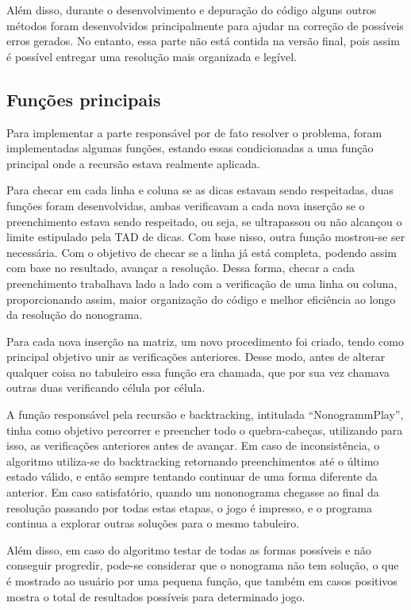 \documentclass{article}
\begin{document}
Além disso, durante o desenvolvimento e depuração do código alguns outros métodos foram desenvolvidos principalmente para ajudar na correção de possíveis erros gerados. No entanto, essa parte não está contida na versão final, pois assim é possível entregar uma resolução mais organizada e legível.

\subsection{Funções principais}

Para implementar a parte responsável por de fato resolver o problema, foram implementadas algumas funções, estando essas condicionadas a uma função principal onde a recursão estava realmente aplicada.

Para checar em cada linha e coluna se as dicas estavam sendo respeitadas, duas funções foram desenvolvidas, ambas verificavam a cada nova inserção se o preenchimento estava sendo respeitado, ou seja, se ultrapassou ou não alcançou o limite estipulado pela TAD de dicas. Com base nisso, outra função mostrou-se ser necessária. Com o objetivo de checar se a linha já está completa, podendo assim com base no resultado, avançar a resolução. Dessa forma, checar a cada preenchimento trabalhava lado a lado com a verificação de uma linha ou coluna, proporcionando assim, maior organização do código e melhor eficiência ao longo da resolução do nonograma.

Para cada nova inserção na matriz, um novo procedimento foi criado, tendo como principal objetivo unir as verificações anteriores. Desse modo, antes de alterar qualquer coisa no tabuleiro essa função era chamada, que por sua vez chamava outras duas verificando célula por célula. 

A função responsável pela recursão e backtracking, intitulada “NonogrammPlay”, tinha como objetivo percorrer e preencher todo o quebra-cabeças, utilizando para isso, as verificações anteriores antes de avançar. Em caso de inconsistência, o algoritmo utiliza-se do backtracking retornando preenchimentos até o último estado válido, e então sempre tentando continuar de uma forma diferente da anterior. Em caso satisfatório, quando um nononograma chegasse ao final da resolução passando por todas estas etapas, o jogo é impresso, e o programa continua a explorar outras soluções para o mesmo tabuleiro.

Além disso, em caso do algoritmo testar de todas as formas possíveis e não conseguir progredir, pode-se considerar que o nonograma não tem solução, o que é mostrado ao usuário por uma pequena função, que também em casos positivos mostra o total de resultados possíveis para determinado jogo. 
\end{document}
